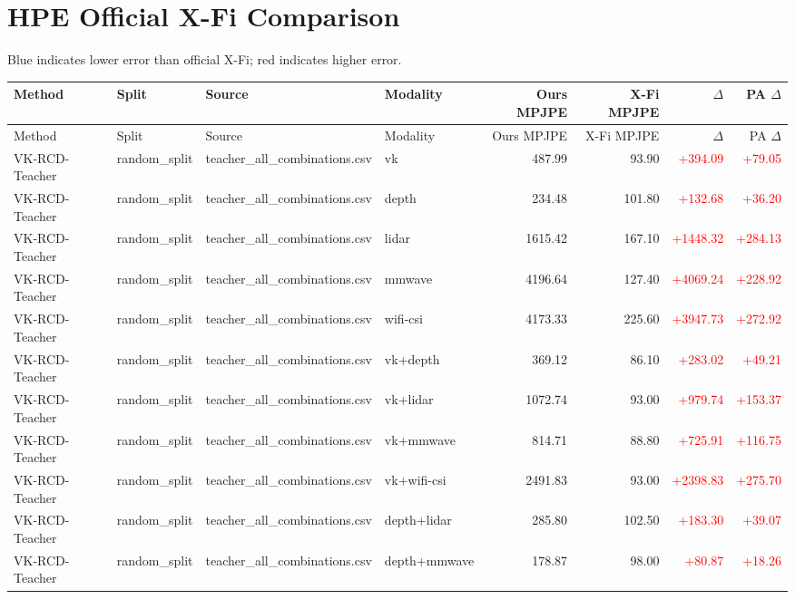 \documentclass[10pt]{article}
\begin{document}
\section*{HPE Official X-Fi Comparison}
Blue indicates lower error than official X-Fi; red indicates higher error.
\scriptsize
\begin{longtable}{llllrrrr}
\toprule
Method & Split & Source & Modality & Ours MPJPE & X-Fi MPJPE & $\Delta$ & PA $\Delta$\\
\midrule
\endfirsthead
\toprule
Method & Split & Source & Modality & Ours MPJPE & X-Fi MPJPE & $\Delta$ & PA $\Delta$\\
\midrule
\endhead
VK-RCD-Teacher & random\_split & teacher\_all\_combinations.csv & vk & 487.99 & 93.90 & \textcolor{red}{+394.09} & \textcolor{red}{+79.05}\\
VK-RCD-Teacher & random\_split & teacher\_all\_combinations.csv & depth & 234.48 & 101.80 & \textcolor{red}{+132.68} & \textcolor{red}{+36.20}\\
VK-RCD-Teacher & random\_split & teacher\_all\_combinations.csv & lidar & 1615.42 & 167.10 & \textcolor{red}{+1448.32} & \textcolor{red}{+284.13}\\
VK-RCD-Teacher & random\_split & teacher\_all\_combinations.csv & mmwave & 4196.64 & 127.40 & \textcolor{red}{+4069.24} & \textcolor{red}{+228.92}\\
VK-RCD-Teacher & random\_split & teacher\_all\_combinations.csv & wifi-csi & 4173.33 & 225.60 & \textcolor{red}{+3947.73} & \textcolor{red}{+272.92}\\
VK-RCD-Teacher & random\_split & teacher\_all\_combinations.csv & vk+depth & 369.12 & 86.10 & \textcolor{red}{+283.02} & \textcolor{red}{+49.21}\\
VK-RCD-Teacher & random\_split & teacher\_all\_combinations.csv & vk+lidar & 1072.74 & 93.00 & \textcolor{red}{+979.74} & \textcolor{red}{+153.37}\\
VK-RCD-Teacher & random\_split & teacher\_all\_combinations.csv & vk+mmwave & 814.71 & 88.80 & \textcolor{red}{+725.91} & \textcolor{red}{+116.75}\\
VK-RCD-Teacher & random\_split & teacher\_all\_combinations.csv & vk+wifi-csi & 2491.83 & 93.00 & \textcolor{red}{+2398.83} & \textcolor{red}{+275.70}\\
VK-RCD-Teacher & random\_split & teacher\_all\_combinations.csv & depth+lidar & 285.80 & 102.50 & \textcolor{red}{+183.30} & \textcolor{red}{+39.07}\\
VK-RCD-Teacher & random\_split & teacher\_all\_combinations.csv & depth+mmwave & 178.87 & 98.00 & \textcolor{red}{+80.87} & \textcolor{red}{+18.26}\\

\end{longtable}
\end{document}
